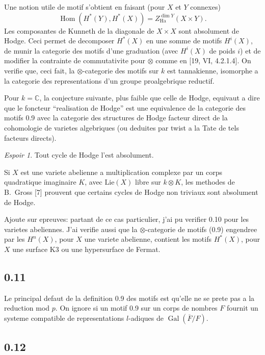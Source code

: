 \documentclass[12pt,a4paper]{article}
\theoremstyle{plain}
\theoremstyle{definition}
\theoremstyle{remark}
\newtheorem{hope}{Espoir}
\DeclareMathOperator{\Hom}{Hom}
\DeclareMathOperator{\Gal}{Gal}
\newcommand{\C}{\mathbb{C}}
\begin{document}
Une notion utile de motif s'obtient en faisant (pour $X$ et $Y$ connexes)
\[
\Hom(H^*(Y), H^*(X)) = Z^{\dim Y}_{\text{Ha}}(X \times Y).
\]
Les composantes de Kunneth de la diagonale de $X \times X$ sont absolument de Hodge.
Ceci permet de decomposer $H^*(X)$ en une somme de motifs $H^i(X)$, de munir la
categorie des motifs d'une graduation (avec $H^i(X)$ de poids $i$) et de modifier la
contrainte de commutativite pour $\otimes$ comme en [19, VI, 4.2.1.4]. On verifie que, ceci
fait, la $\otimes$-categorie des motifs sur $k$ est tannakienne, isomorphe a la categorie des
representations d'un groupe proalgebrique reductif.

Pour $k = \C$, la conjecture suivante, plus faible que celle de Hodge, equivaut a dire
que le foncteur ``realisation de Hodge'' est une equivalence de la categorie des motifs
0.9 avec la categorie des structures de Hodge facteur direct de la cohomologie de
varietes algebriques (ou deduites par twist a la Tate de tels facteurs directs).

\begin{hope}\label{esp:0.10}
Tout cycle de Hodge l'est absolument.
\end{hope}

Si $X$ est une variete abelienne a multiplication complexe par un corps quadratique
imaginaire $K$, avec $\text{Lie}(X)$ libre sur $k \otimes K$, les methodes de B.~Gross [7]
prouvent que certains cycles de Hodge non triviaux sont absolument de Hodge.

Ajoute sur epreuves: partant de ce cas particulier, j'ai pu verifier 0.10 pour les varietes
abeliennes. J'ai verifie aussi que la $\otimes$-categorie de motifs (0.9) engendree par les
$H^n(X)$, pour $X$ une variete abelienne, contient les motifs $H^*(X)$, pour $X$ une surface
K3 ou une hypersurface de Fermat.

\subsection*{0.11}

Le principal defaut de la definition 0.9 des motifs est qu'elle ne se prete pas a la
reduction mod $p$. On ignore si un motif 0.9 sur un corps de nombres $F$ fournit un
systeme compatible de representations $l$-adiques de $\Gal(\overline{F}/F)$.

\subsection*{0.12}
\end{document}
